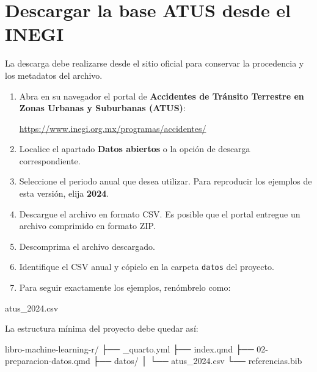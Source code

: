 \documentclass[
  spanish,
  10.5pt,
  letterpaper,
  openany,
  headings=big]{scrbook}
\newenvironment{Shaded}{}{}
\newcommand{\NormalTok}[1]{\textcolor[rgb]{0.14,0.16,0.18}{#1}}
\begin{document}
\section{Descargar la base ATUS desde el
INEGI}\label{descargar-la-base-atus-desde-el-inegi}

La descarga debe realizarse desde el sitio oficial para conservar la
procedencia y los metadatos del archivo.

\begin{enumerate}
\def\labelenumi{\arabic{enumi}.}
\item
  Abra en su navegador el portal de \textbf{Accidentes de Tránsito
  Terrestre en Zonas Urbanas y Suburbanas (ATUS)}:

  \url{https://www.inegi.org.mx/programas/accidentes/}
\item
  Localice el apartado \textbf{Datos abiertos} o la opción de descarga
  correspondiente.
\item
  Seleccione el periodo anual que desea utilizar. Para reproducir los
  ejemplos de esta versión, elija \textbf{2024}.
\item
  Descargue el archivo en formato CSV. Es posible que el portal entregue
  un archivo comprimido en formato ZIP.
\item
  Descomprima el archivo descargado.
\item
  Identifique el CSV anual y cópielo en la carpeta \texttt{datos} del
  proyecto.
\item
  Para seguir exactamente los ejemplos, renómbrelo como:
\end{enumerate}

\begin{Shaded}
\begin{Highlighting}[]
\NormalTok{atus\_2024.csv}
\end{Highlighting}
\end{Shaded}

La estructura mínima del proyecto debe quedar así:

\begin{Shaded}
\begin{Highlighting}[]
\NormalTok{libro{-}machine{-}learning{-}r/}
\NormalTok{├── \_quarto.yml}
\NormalTok{├── index.qmd}
\NormalTok{├── 02{-}preparacion{-}datos.qmd}
\NormalTok{├── datos/}
\NormalTok{│   └── atus\_2024.csv}
\NormalTok{└── referencias.bib}
\end{Highlighting}
\end{Shaded}
\end{document}

